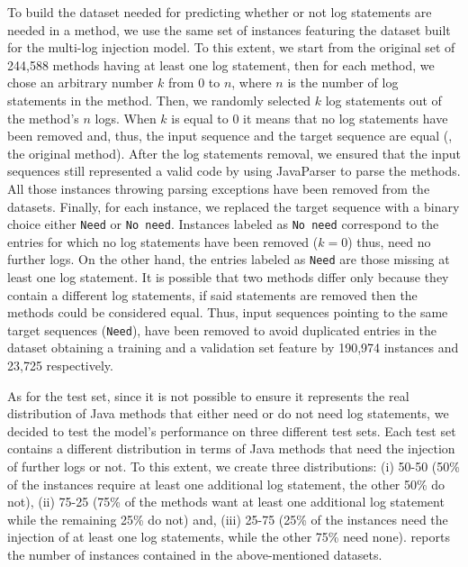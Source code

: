 To build the dataset needed for predicting whether or not log statements are needed in a \java method, we use the same set of instances featuring the dataset built for the multi-log injection model. To this extent, we start from the original set of 244,588 \java methods having at least one log statement, then for each method, we chose an arbitrary number $k$ from 0 to $n$, where $n$ is the number of log statements in the method. Then, we randomly selected $k$ log statements out of the
method's $n$ logs. When $k$ is equal to 0 it means that no log statements have been removed and, thus, the input sequence and the target sequence are equal (\ie, the original \java method). After the log statements removal, we ensured that the input sequences still represented a valid \java code by using JavaParser \cite{javaparser} to parse the methods. All those instances throwing parsing exceptions have been removed from the datasets. 
Finally, for each instance, we replaced the target sequence with a binary choice either \texttt{Need} or \texttt{No need}. Instances labeled as \texttt{No need} correspond to the entries for which no log statements have been removed (\ie $k=0$) thus, need no further logs. On the other hand, the entries labeled as \texttt{Need} are those missing at least one log statement. It is possible that two methods differ only because they contain a different log statements, if said statements are removed then the methods could be considered equal. Thus, input sequences pointing to the same target sequences (\ie \texttt{Need}), have been removed to avoid duplicated entries in the dataset obtaining a training and a validation set feature by 190,974 instances and 23,725 respectively.

As for the test set, since it is not possible to ensure it represents the real distribution of Java methods that either need or do not need log statements, we decided to test the model's performance on three different test sets. Each test set contains a different distribution in terms of Java methods that need the injection of further logs or not. To this extent, we create three distributions:  (i) 50-50 (50\% of the instances require at least one additional log statement, the other 50\% do not), (ii) 75-25 (75\% of the methods want at least one additional log statement while the remaining 25\% do not) and, (iii) 25-75 (25\% of the instances need the injection of at least one log statements, while the other 75\% need none).
 reports the number of instances contained in the above-mentioned datasets.

